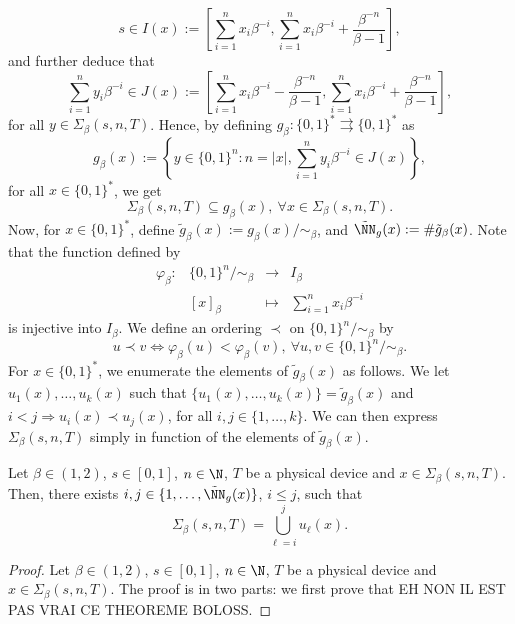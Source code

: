 \begin{equation}
    s \in I(x) := \left[\sum_{i=1}^{n} x_i \beta^{-i},  \sum_{i=1}^{n} x_i \beta^{-i}+ \frac{\beta^{-n}}{\beta-1} \right],
\end{equation}
and further deduce that 
\begin{equation}
    \sum_{i=1}^n y_i \beta^{-i} \in J(x) := \left[\sum_{i=1}^{n} x_i \beta^{-i} - \frac{\beta^{-n}}{\beta-1},  \sum_{i=1}^{n} x_i \beta^{-i}+ \frac{\beta^{-n}}{\beta-1} \right],
\end{equation}
for all $y \in \Sigma_\beta(s,n,T)$. Hence, by defining $g_\beta : \{0,1\}^\ast \rightrightarrows \{0,1\}^\ast$ as 
\begin{equation}
    g_\beta(x) := \left\{ y \in \{0,1\}^n : n = |x|,  \sum_{i=1}^n y_i \beta^{-i} \in J(x)\right\},
\end{equation}
for all $x \in \{0,1\}^\ast$, we get 
\begin{equation}
    \Sigma_\beta(s,n,T) \subseteq g_\beta(x), \ \forall x \in \Sigma_\beta(s,n,T).
\end{equation}
Now, for $x \in \{0,1\}^\ast$, define $\tilde g_\beta(x) := g_\beta(x)/ \sim_\beta$, and $\tilde \NN_g(x) := \# \tilde g_\beta(x)$. Note that the function defined by
\begin{equation}
    \begin{array}{rccc}
        \varphi_\beta : & \{0,1\}^n / \sim_\beta & \to & I_\beta\\
        & [x]_\beta & \mapsto & \sum_{i=1}^n x_i \beta^{-i}
    \end{array}
\end{equation}
is injective into $I_\beta$. We define an ordering $\prec$ on $\{0,1\}^n / \sim_\beta$ by 
\begin{equation}
    u \prec v \iff \varphi_\beta(u) < \varphi_\beta(v), \ \forall u,v \in \{0,1\}^n / \sim_\beta.
\end{equation}
For $x \in \{0,1\}^\ast$, we enumerate the elements of $\tilde g_\beta(x)$ as follows. We let $u_1(x), \ldots, u_{k}(x)$ such that $\{u_1(x), \ldots, u_k(x)\} = \tilde g_\beta(x)$ and $i < j \Rightarrow u_i(x) \prec u_j(x)$, for all $i,j \in \{1, \ldots, k\}$. We can then express $\Sigma_\beta(s,n,T)$ simply in function of the elements of $\tilde g_\beta(x)$. 
\begin{lemma}
    Let $\beta \in (1,2)$, $s \in [0,1]$, $n \in \N$, $T$ be a physical device and $x \in \Sigma_\beta(s,n,T)$. Then, there exists $i,j \in \{1, \ldots, \tilde \NN_g(x)\}$, $i \leq j$, such that 
    \begin{equation}
        \Sigma_\beta(s,n,T) = \bigcup_{\ell=i}^ju_\ell(x).
    \end{equation}
\end{lemma}
\begin{proof}
    Let $\beta \in (1,2)$, $s \in [0,1]$, $n \in \N$, $T$ be a physical device and $x \in \Sigma_\beta(s,n,T)$. The proof is in two parts: we first prove that EH NON IL EST PAS VRAI CE THEOREME BOLOSS.
\end{proof}


